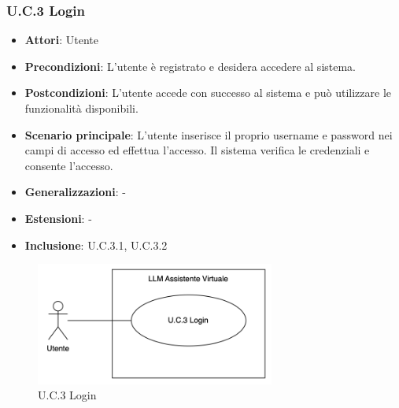 \subsubsection{U.C.3 Login}
\begin{itemize}
    \item \textbf{Attori}: Utente
    \item \textbf{Precondizioni}:  L'utente è registrato e desidera accedere al sistema.
    \item \textbf{Postcondizioni}: L'utente accede con successo al sistema e può utilizzare le funzionalità disponibili.
    \item \textbf{Scenario principale}: L'utente inserisce il proprio username e password nei campi di accesso ed effettua l’accesso. Il sistema verifica le credenziali e consente l'accesso.
    \item \textbf{Generalizzazioni}: -
    \item \textbf{Estensioni}: -
    \item \textbf{Inclusione}: U.C.3.1, U.C.3.2
\end{itemize}
\begin{figure}[H]
    \centering
    \includegraphics[width=0.7\textwidth]{img/UC3.png}
    \caption{U.C.3 Login}
\end{figure}
\newpage

